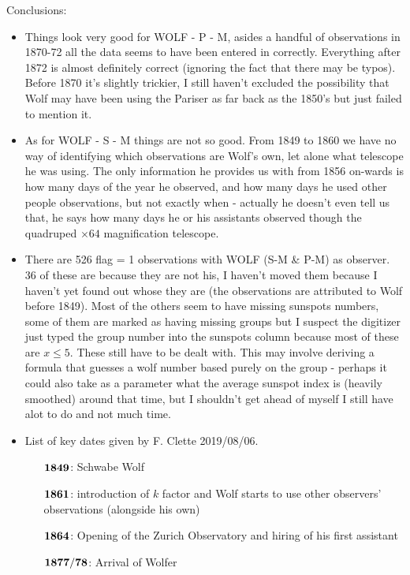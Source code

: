 \documentclass[12pt]{article}
\begin{document}
Conclusions:
\begin{itemize}
    \item Things look very good for WOLF - P - M, asides a handful of observations in 1870-72 all the data seems to have been entered in correctly. Everything after 1872 is almost definitely correct (ignoring the fact that there may be typos). Before 1870 it's slightly trickier, I still haven't excluded the possibility that Wolf may have been using the Pariser as far back as the 1850's but just failed to mention it. 
    \item As for WOLF - S - M things are not so good. From 1849 to 1860 we have no way of identifying which observations are Wolf's own, let alone what telescope he was using. The only information he provides us with from 1856 on-wards is how many days of the year he observed, and how many days he used other people observations, but not exactly when - actually he doesn't even tell us that, he says how many days he or his assistants observed though the quadruped $\times 64$ magnification telescope.
    \item There are 526 flag = 1 observations with WOLF (S-M \& P-M) as observer. 36 of these are because they are not his, I haven't moved them because I haven't yet found out whose they are (the observations are attributed to Wolf before 1849). Most of the others seem to have missing sunspots numbers, some of them are marked as having missing groups but I suspect the digitizer just typed the group number into the sunspots column because most of these are $x\leq 5$. These still have to be dealt with. This may involve deriving a formula that guesses a wolf number based purely on the group - perhaps it could also take as a parameter what the average sunspot index is (heavily smoothed) around that time, but I shouldn't get ahead of myself I still have alot to do and not much time.
       \item List of key dates given by F. Clette 2019/08/06.
    \begin{itemize}
        \item[$\bold{1849}$:] Schwabe Wolf
        \item[$\bold{1861}$:] introduction of $k$ factor and Wolf starts to use other observers' observations (alongside his own)
        \item[$\bold{1864}$:] Opening of the Z\¨urich Observatory and hiring of his first assistant
        \item[$\bold{1877 / 78}$:] Arrival of Wolfer
    \end{itemize}

\end{itemize}
\end{document}
